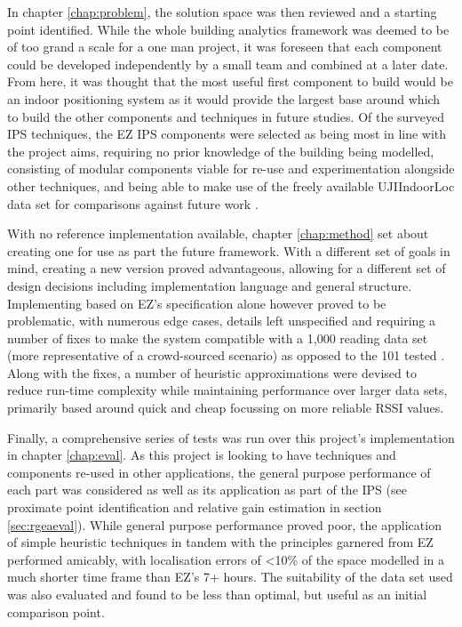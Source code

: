 \documentclass{UoYCSproject}
\begin{document}
        In chapter \ref{chap:problem}, the solution space was then reviewed and a starting point identified. While the whole building analytics framework was deemed to be of too grand a scale for a one man project, it was foreseen that each component could be developed independently by a small team and combined at a later date. From here, it was thought that the most useful first component to build would be an indoor positioning system as it would provide the largest base around which to build the other components and techniques in future studies. Of the surveyed IPS techniques, the EZ IPS components were selected as being most in line with the project aims, requiring no prior knowledge of the building being modelled, consisting of modular components viable for re-use and experimentation alongside other techniques, and being able to make use of the freely available UJIIndoorLoc data set for comparisons against future work \citep{chintalapudi2010indoor, torres2014ujiindoorloc}.
        
        With no reference implementation available, chapter \ref{chap:method} set about creating one for use as part the future framework. With a different set of goals in mind, creating a new version proved advantageous, allowing for a different set of design decisions including implementation language and general structure. Implementing based on EZ's specification alone however proved to be problematic, with numerous edge cases, details left unspecified and requiring a number of fixes to make the system compatible with a 1,000 reading data set (more representative of a crowd-sourced scenario) as opposed to the 101 tested \citep{chintalapudi2010indoor}. Along with the fixes, a number of heuristic approximations were devised to reduce run-time complexity while maintaining performance over larger data sets, primarily based around quick and cheap focussing on more reliable RSSI values.
        
        Finally, a comprehensive series of tests was run over this project's implementation in chapter \ref{chap:eval}. As this project is looking to have techniques and components re-used in other applications, the general purpose performance of each part was considered as well as its application as part of the IPS (see proximate point identification and relative gain estimation in section \ref{sec:rgeaeval}). While general purpose performance proved poor, the application of simple heuristic techniques in tandem with the principles garnered from EZ performed amicably, with localisation errors of <10\% of the space modelled in a much shorter time frame than EZ's 7+ hours. The suitability of the data set used was also evaluated and found to be less than optimal, but useful as an initial comparison point.
        
\end{document}
